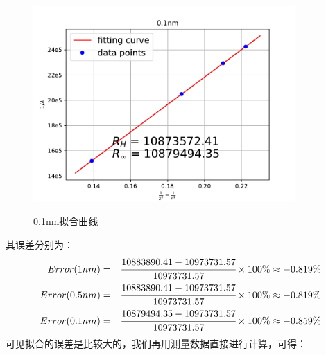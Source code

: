 \documentclass[a4paper]{article}
\begin{document}
\begin{enumerate}
\begin{figure}[!h]
\centering
\includegraphics[width=10cm]{fig/fitting01nm.pdf}\\
\caption{0.1nm拟合曲线}\label{fitting01}
\end{figure}

其误差分别为：
\begin{eqnarray}
Error(1nm) &=& \cfrac{10883890.41 - 10973731.57}{10973731.57}\times 100\% \approx -0.819\%\\
Error(0.5nm) &=& \cfrac{10883890.41 - 10973731.57}{10973731.57}\times 100\% \approx -0.819\%\\
Error(0.1nm) &=& \cfrac{10879494.35 - 10973731.57}{10973731.57}\times 100\% \approx -0.859\%
\end{eqnarray}
可见拟合的误差是比较大的，我们再用测量数据直接进行计算，可得：


\end{enumerate}
\end{document}
